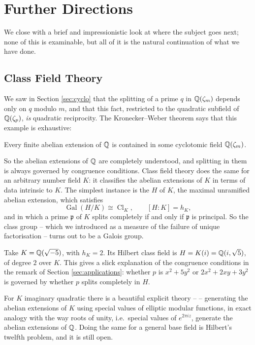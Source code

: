 \documentclass[a4paper]{scrartcl}
\newcommand{\Cl}{\operatorname{Cl}}
\newcommand{\Gal}{\operatorname{Gal}}
\newcommand{\fp}{\mathfrak{p}}
\begin{document}
\section{Further Directions}

We close with a brief and impressionistic look at where the subject goes next; none of this is examinable, but all of it is the natural continuation of what we have done.

\subsection{Class Field Theory}

We saw in Section \ref{sec:cyclo} that the splitting of a prime $q$ in $\mathbb{Q}(\zeta_m)$ depends only on $q$ modulo $m$, and that this fact, restricted to the quadratic subfield of $\mathbb{Q}(\zeta_p)$, \emph{is} quadratic reciprocity. The Kronecker--Weber theorem says that this example is exhaustive:

\begin{theorem}
	Every finite abelian extension of $\mathbb{Q}$ is contained in some cyclotomic field $\mathbb{Q}(\zeta_m)$.
\end{theorem}

So the abelian extensions of $\mathbb{Q}$ are completely understood, and splitting in them is always governed by congruence conditions. Class field theory does the same for an arbitrary number field $K$: it classifies the abelian extensions of $K$ in terms of data intrinsic to $K$. The simplest instance is the  $H$ of $K$, the maximal unramified abelian extension, which satisfies
$$\Gal(H/K)\cong\Cl_K, \qquad [H:K] = h_K,$$
and in which a prime $\fp$ of $K$ splits completely if and only if $\fp$ is principal. So the class group -- which we introduced as a measure of the failure of unique factorisation -- turns out to be a Galois group.

\begin{example}
	Take $K = \mathbb{Q}(\sqrt{-5})$, with $h_K = 2$. Its Hilbert class field is $H = K(i) = \mathbb{Q}(i,\sqrt5)$, of degree $2$ over $K$. This gives a slick explanation of the congruence conditions in the remark of Section \ref{sec:applications}: whether $p$ is $x^2+5y^2$ or $2x^2+2xy+3y^2$ is governed by whether $p$ splits completely in $H$.
\end{example}

For $K$ imaginary quadratic there is a beautiful explicit theory --  -- generating the abelian extensions of $K$ using special values of elliptic modular functions, in exact analogy with the way roots of unity, i.e.\ special values of $e^{2\pi iz}$, generate the abelian extensions of $\mathbb{Q}$. Doing the same for a general base field is Hilbert's twelfth problem, and it is still open.
\end{document}
